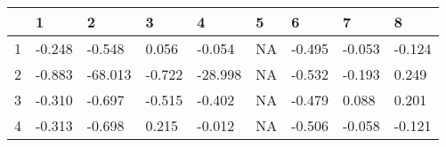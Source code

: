 \begin{table}[ht]
\centering
\begin{tabular}{rllllllll}
  \hline
 & 1 & 2 & 3 & 4 & 5 & 6 & 7 & 8 \\ 
  \hline
1 &  -0.248 &  -0.548 &   0.056 &  -0.054 &      NA &  -0.495 &  -0.053 &  -0.124 \\ 
  2 &  -0.883 & -68.013 &  -0.722 & -28.998 &      NA &  -0.532 &  -0.193 &   0.249 \\ 
  3 &  -0.310 &  -0.697 &  -0.515 &  -0.402 &      NA &  -0.479 &   0.088 &   0.201 \\ 
  4 &  -0.313 &  -0.698 &   0.215 &  -0.012 &      NA &  -0.506 &  -0.058 &  -0.121 \\ 
   \hline
\end{tabular}
\end{table}
